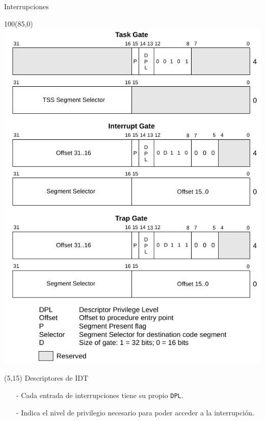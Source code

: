 \documentclass[aspectratio=169]{beamer}
\begin{document}
\begin{frame}{Interrupciones}
    \begin{textblock}{100}(85,0) \includegraphics[scale=0.7]{img/interruptsGates.pdf} \end{textblock}
    \begin{textblock}{70}(5,15)
    \textcolor{verdeuca}{Descriptores de IDT}\\
    \begin{itemize}
     \item[-] Cada entrada de interrupciones tiene su propio \texttt{DPL}.
     \item[-] Indica el nivel de privilegio necesario para poder acceder a la interrupción.
    \end{itemize}
    \end{textblock}
\end{frame}
\end{document}
